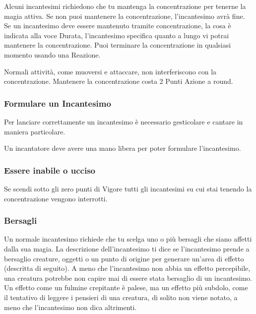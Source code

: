 \documentclass[12pt,a4paper,twoside,openany]{book}
\begin{document}
\begin{multicols}{2}
\begin{itemize}
Alcuni incantesimi richiedono che tu mantenga la concentrazione per tenerne la magia attiva. Se non puoi mantenere la concentrazione, l'incantesimo avrà fine. Se un incantesimo deve essere mantenuto tramite concentrazione, la cosa è indicata alla voce Durata, l'incantesimo specifica quanto a lungo vi potrai mantenere la concentrazione. Puoi terminare la concentrazione in qualsiasi momento usando una Reazione.
	
Normali attività, come muoversi e attaccare, non interferiscono con la concentrazione. Mantenere la concentrazione costa 2 Punti Azione a round.

\end{itemize}

\subsubsection{Formulare un Incantesimo}

Per lanciare correttamente un incantesimo è necessario gesticolare e cantare in maniera particolare.

Un incantatore deve avere una mano libera per poter formulare l'incantesimo.

\subsubsection{Essere inabile o ucciso}\label{magieessereucciso}

Se scendi sotto gli zero punti di Vigore tutti gli incantesimi su cui stai tenendo la concentrazione vengono interrotti.

\subsubsection{Bersagli}\label{magiebersagli}

Un normale incantesimo richiede che tu scelga uno o più bersagli che siano affetti dalla sua magia. La descrizione dell'incantesimo ti dice se l'incantesimo prende a bersaglio creature, oggetti o un punto di origine per generare un'area di effetto (descritta di seguito). A meno che l'incantesimo non abbia un effetto percepibile, una creatura potrebbe non capire mai di essere stata bersaglio di un incantesimo. Un effetto come un fulmine crepitante è palese, ma un effetto più subdolo, come il tentativo di leggere i pensieri di una creatura, di solito non viene notato, a meno che l'incantesimo non dica altrimenti.


\end{multicols}
\end{document}
